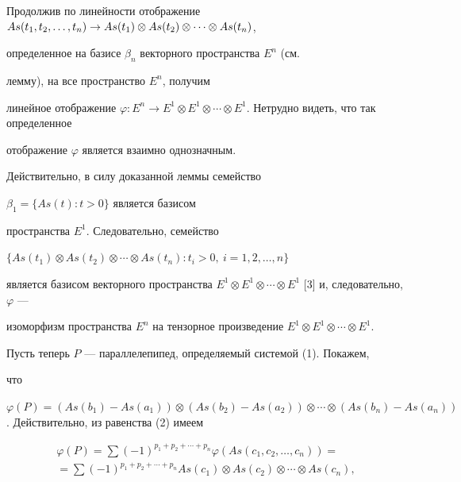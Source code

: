 \begin{pf} 


Продолжив по линейности отображение $As(t_1,t_2,\dotsc,t_n)\to 


As(t_1)\otimes\linebreak As(t_2)\otimes \dotsb\otimes As(t_n)$, 


определенное на базисе $\beta_n$ векторного пространства $E^n$ (см.  


лемму), на все пространство $E^n$, получим  


линейное отображение $\varphi:E^n\to E^1\otimes E^1\otimes 


\dotsb\otimes E^1$. Нетрудно видеть, что так определенное  


отображение $\varphi$ является взаимно однозначным.  


Действительно, в силу доказанной леммы семейство 


$\beta_1=\{As(t):t>0\}$ является базисом  


пространства $E^1$. Следовательно, семейство 


$\{As(t_1)\otimes As(t_2)\otimes \dotsb\otimes As(t_n): t_i>0,\ 


i=1,2,\dotsc,n\}$ 


является базисом векторного пространства $E^1\otimes E^1\otimes 


\dotsb\otimes E^1$ [3] и, следовательно, $\varphi$ --- 


изоморфизм пространства $E^n$ на тензорное произведение $E^1\otimes 


E^1\otimes \dotsb\otimes E^1$. 


 


Пусть теперь $P$ --- параллелепипед, определяемый системой (1). Покажем, 


что  


$\varphi(P)=(As(b_1)-As(a_1))\otimes (As(b_2)-As(a_2))\otimes 


\dotsb\otimes (As(b_n)-As(a_n))$. Действительно, из равенства (2) имеем 


\begin{multline} 


\varphi(P)=\sum(-1)^{p_1+p_2+\dotsb+p_n}\varphi 


(As(c_1,c_2,\dotsc,c_n))= \\ =\sum 


(-1)^{p_1+p_2+\dotsb+p_n}As(c_1)\otimes 


As(c_2)\otimes\dotsb\otimes As(c_n), 



\end{multline}
\end{pf}
